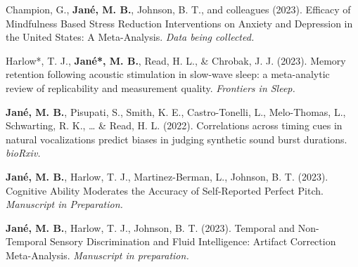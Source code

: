 \documentclass[
  letterpaper,
  DIV=11,
  numbers=noendperiod]{scrartcl}
\begin{document}
Champion, G., \textbf{Jané, M. B.}, Johnson, B. T., and colleagues
(2023). Efficacy of Mindfulness Based Stress Reduction Interventions on
Anxiety and Depression in the United States: A Meta-Analysis. \emph{Data
being collected.}

Harlow*, T. J., \textbf{Jané*, M. B.}, Read, H. L., \& Chrobak, J. J.
(2023). Memory retention following acoustic stimulation in slow-wave
sleep: a meta-analytic review of replicability and measurement quality.
\emph{Frontiers in Sleep.}

\textbf{Jané, M. B.}, Pisupati, S., Smith, K. E., Castro-Tonelli, L.,
Melo-Thomas, L., Schwarting, R. K., \ldots{} \& Read, H. L. (2022).
Correlations across timing cues in natural vocalizations predict biases
in judging synthetic sound burst durations. \emph{bioRxiv.}

\textbf{Jané, M. B.}, Harlow, T. J., Martinez-Berman, L., Johnson, B. T.
(2023). Cognitive Ability Moderates the Accuracy of Self-Reported
Perfect Pitch. \emph{Manuscript in Preparation.}

\textbf{Jané, M. B.}, Harlow, T. J., Johnson, B. T. (2023). Temporal and
Non-Temporal Sensory Discrimination and Fluid Intelligence: Artifact
Correction Meta-Analysis. \emph{Manuscript in preparation.}
\end{document}
